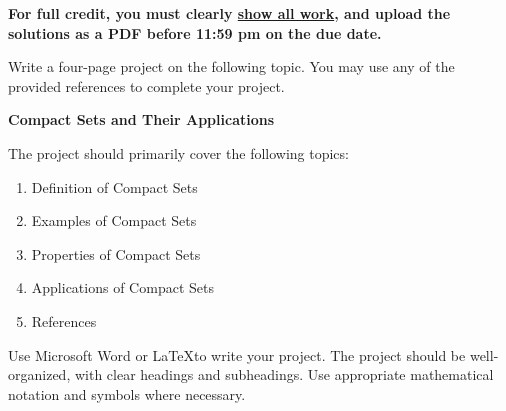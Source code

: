 \documentclass[11pt]{book}
\begin{document}
\thispagestyle{fancy}
\noindent	\textbf{For full credit, you must clearly \underline{show all work}, and upload the solutions as a PDF before 11:59 pm on the due date.}\hfill
\vspace{0.3in}

Write a four-page project on the following topic. You may use any of the provided references to complete your project.

\begin{center}
\textbf{Compact Sets and Their Applications}
\end{center}

\vspace{0.2in}

The project should primarily cover the following topics:

\begin{enumerate}
\item Definition of Compact Sets
\item Examples of Compact Sets
\item Properties of Compact Sets
\item Applications of Compact Sets
\item References
\end{enumerate}

Use Microsoft Word or \LaTeX to write your project. The project should be well-organized, with clear headings and subheadings. Use appropriate mathematical notation and symbols where necessary.
\end{document}
